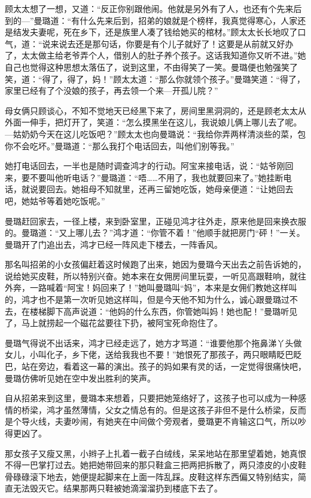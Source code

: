 \par 顾太太想了一想，又道：“反正你别跟他闹。他就是另外有了人，也还有个先来后到的—”曼璐道：“有什么先来后到，招弟的娘就是个榜样，我真觉得寒心，人家还是结发夫妻呢，死在乡下，还是族里人凑了钱给她买的棺材。”顾太太长长地叹了口气，道：“说来说去还是那句话，你要是有个儿子就好了！这要是从前就又好办了，太太做主给老爷弄个人，借别人的肚子养个孩子。这话我知道你又听不进。”她自己也觉得这种思想太落伍了，说到这里，不由得笑了一笑。曼璐便也勉强笑了笑，道：“得了，得了，妈！”顾太太道：“那么你就领个孩子。”曼璐笑道：“得了，家里已经有了个没娘的孩子，再去领一个来—开孤儿院？”
\par 母女俩只顾谈心，不知不觉地天已经黑下来了，房间里黑洞洞的，还是顾老太太从外面一伸手，把灯开了，笑道：“怎么摸黑坐在这儿，我说娘儿俩上哪儿去了呢。—姑奶奶今天在这儿吃饭吧？”顾太太也向曼璐说：“我给你弄两样清淡些的菜，包你不会吃坏。”曼璐道：“那么我打个电话回去，叫他们别等我。”
\par 她打电话回去，一半也是随时调查鸿才的行动。阿宝来接电话，说：“姑爷刚回来，要不要叫他听电话？”曼璐道：“唔……不用了，我也就要回来了。”她挂断电话，就说要回去。她祖母不知就里，还再三留她吃饭，她母亲便道：“让她回去吧，她姑爷等着她吃饭呢。”
\par 曼璐赶回家去，一径上楼，来到卧室里，正碰见鸿才往外走，原来他是回来换衣服的。曼璐道：“又上哪儿去？”鸿才道：“你管不着！”他顺手就把房门“砰！”一关。曼璐开了门追出去，鸿才已经一阵风走下楼去，一阵香风。
\par 那名叫招弟的小女孩偏赶着这时候跑了出来，她因为曼璐今天出去之前告诉她的，说给她买皮鞋，所以特别兴奋。她本来在女佣房间里玩耍，一听见高跟鞋响，就往外奔，一路喊着“阿宝！妈回来了！”她叫曼璐叫“妈”，本来是女佣们教她这样叫的，鸿才也不是第一次听见她这样叫，但是今天他不知为什么，诚心跟曼璐过不去，在楼梯脚下高声说道：“他妈的什么东西，你管她叫妈！她也配！”曼璐听见了，马上就捞起一个磁花盆要往下扔，被阿宝死命抱住了。
\par 曼璐气得说不出话来，鸿才已经走远了，她方才骂道：“谁要他那个拖鼻涕丫头做女儿，小叫化子，乡下佬，送给我我也不要！”她恨死了那孩子，两只眼睛眨巴眨巴，站在旁边，看着这一幕的演出。孩子的妈如果有灵的话，一定觉得很痛快吧，曼璐仿佛听见她在空中发出胜利的笑声。
\par 自从招弟来到这里，曼璐本来想着，只要把她笼络好了，这孩子也可以成为一种感情的桥梁，鸿才虽然薄情，父女之情总有的。但是这孩子非但不是什么桥梁，反而是个导火线，夫妻吵闹，有她夹在中间做个旁观者，曼璐更不肯输这口气，所以吵得更凶了。
\par 那女孩子又瘦又黑，小辫子上扎着一截子白绒线，呆呆地站在那里望着她，她真恨不得一巴掌打过去。她把她带回来的那只鞋盒三把两把拆散了，两只漆皮的小皮鞋骨碌碌滚下地去，她便提起脚来在上面一阵乱踩。皮鞋这样东西偏又特别结实，简直无法毁灭它。结果那两只鞋被她滴溜溜扔到楼底下去了。
